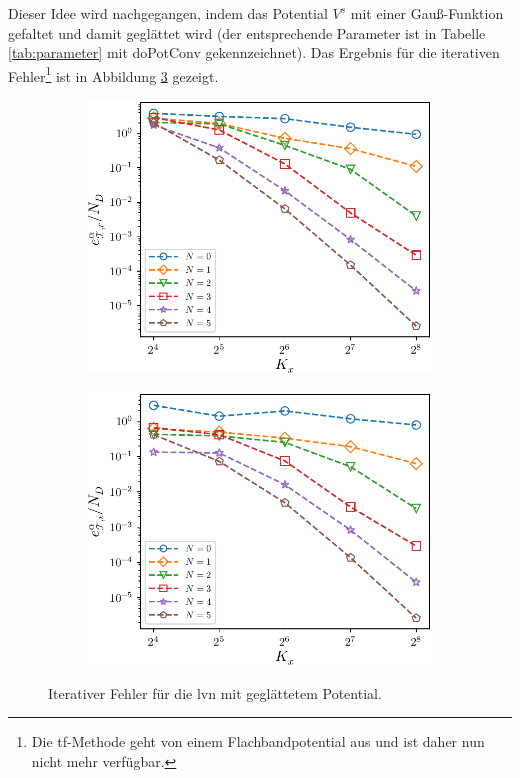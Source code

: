 Dieser Idee wird nachgegangen, indem das Potential $V^s$ mit einer Gauß-Funktion gefaltet und damit geglättet wird (der entsprechende Parameter ist in Tabelle \ref{tab:parameter} mit doPotConv gekennzeichnet). Das Ergebnis für die iterativen Fehler\footnote{Die \ac{tf}-Methode geht von einem Flachbandpotential aus und ist daher nun nicht mehr verfügbar.} ist in Abbildung \ref{fig:rates2} gezeigt.
\begin{figure}
    \centering
    \begin{subfigure}[b]{0.48\textwidth}
        \centering
        \includegraphics[width=\textwidth]{plots/test5/convGL1.pdf}
        \label{fig:rates2_1}
    \end{subfigure}
    \hfill
    \begin{subfigure}[b]{0.48\textwidth}
        \centering
        \includegraphics[width=\textwidth]{plots/test5/convGL1_i.pdf}
        \label{fig:rates2_2}
    \end{subfigure}
  \caption{Iterativer Fehler für die \ac{lvn} mit geglättetem Potential.}
  \label{fig:rates2}
\end{figure}
